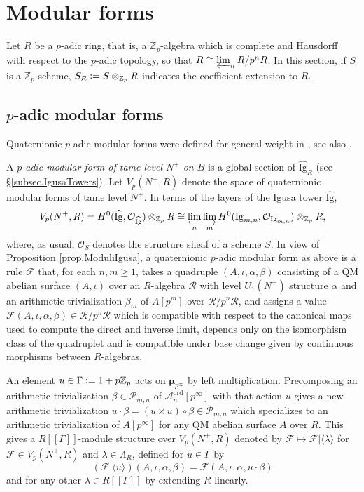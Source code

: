 \documentclass[a4paper]{amsart}
\numberwithin{equation}{section}
\theoremstyle{definition}
\newcommand{\Z}{\mathbb{Z}}
\newcommand{\defeq}{\vcentcolon=}
\newcommand{\ord}{\mathrm{ord}}
\begin{document}
\section{Modular forms}

Let $R$ be a $p$-adic ring, that is, a $\Z_{p}$-algebra which is complete and Hausdorff with respect to the $p$-adic topology, so that $R \cong \varprojlim_n R/p^nR$. In this section, if $S$ is a $\Z_p$-scheme, $S_R\defeq S\otimes_{\Z_p}R$ indicates the coefficient extension to $R$.

\subsection{$p$-adic modular forms}
Quaternionic $p$-adic modular forms were defined for general weight in \cite{Brasca.QuaternionicMF}, see also \cite{Kassaei.Thesis}.

A \textit{$p$-adic modular form of tame level $N^{+}$ on $B$} is a global section of $\widehat{\mathrm{Ig}}_R$ (see \S\ref{subsec.IgusaTowers}). Let $V_p(N^+,R)$ denote the space of quaternionic modular forms of tame level $N^+$. In terms of the layers of the Igusa tower $\widehat{\mathrm{Ig}}$, 
\[V_p(N^+,R)=H^0(\widehat{\mathrm{Ig}},\mathcal{O}_{\widehat{\mathrm{Ig}}})\otimes_{\Z_p}R\cong\varprojlim_n\varinjlim_m H^0(\mathrm{Ig}_{m,n},\mathcal{O}_{\mathrm{Ig}_{m,n}})\otimes_{\Z_p}R,\]
where, as usual, $\mathcal{O}_S$ denotes the structure sheaf of a scheme $S$. In view of Proposition \ref{prop.ModuliIgusa}, a quaternionic $p$-adic modular form as above is a rule $\mathcal{F}$ that, for each $n,m\ge1$, takes a quadruple $(A,\iota,\alpha, \beta)$ consisting of a QM abelian surface $(A,\iota)$ over an $R$-algebra $\mathcal{R}$ with level $U_1(N^+)$ structure $\alpha$ and an arithmetic trivialization $\beta_m$ of $A[p^m]$ over $\mathcal{R}/p^n\mathcal{R}$, and assigns a value $\mathcal{F}(A,\iota,\alpha, \beta)\in \mathcal{R}/p^n \mathcal{R}$ which is compatible with respect to the canonical maps used to compute the direct and inverse limit, depends only on the isomorphism class of the quadruplet and is compatible under base change given by continuous morphisms between $R$-algebras. 

An element $u\in \Gamma\defeq 1+p\Z_p$ acts on $\boldsymbol{\mu}_{p^\infty}$ by left multiplication. Precomposing an arithmetic trivialization $\beta\in\mathcal{P}_{m,n}$ of $\mathcal{A}^\ord_n[p^\infty]$ with that action $u$ gives a new arithmetic trivialization $u\cdot\beta=(u\times u)\circ\beta\in\mathcal{P}_{m,n}$ which specializes to an arithmetic trivialization of $A[p^\infty]$ for any QM abelian surface $A$ over $R$. This gives a $R[\![\Gamma]\!]$-module structure over $V_p(N^+,R)$ denoted by $\mathcal{F}\mapsto \mathcal{F}|\langle \lambda\rangle$ for $\mathcal{F}\in V_p(N^+,R)$ and $\lambda\in\Lambda_R$, defined for $u\in\Gamma$ by 
\[ (\mathcal{F}|\langle u\rangle)(A,\iota,\alpha, \beta )=\mathcal{F} (A,\iota,\alpha, u\cdot \beta)\]
and for any other $\lambda\in R[\![\Gamma]\!]$ by extending $R$-linearly.
 
\end{document}
